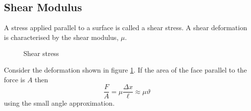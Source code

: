     \subsection{Shear Modulus}
    A stress applied parallel to a surface is called a shear stress.
    A shear deformation is characterised by the shear modulus, \(\mu\).
    \begin{figure}[ht]
        \centering
        \caption{Shear stress}
        \label{fig:shear stress}
    \end{figure}
    Consider the deformation shown in figure \ref{fig:shear stress}.
    If the area of the face parallel to the force is \(A\) then
    \[\frac{F}{A} = \mu\frac{\Delta x}{\ell} \approx \mu\vartheta\]
    using the small angle approximation.
    
